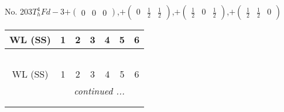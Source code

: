 \documentclass[fleqn,9pt,landscape]{jsarticle}
\begin{document}
\begin{center}
\begin{longtable}{ccccccc}
\end{longtable}
\end{center}
\newpage
No. 203\quad$T_{h}^{4}$\quad$Fd-3$\quad[ cubic ]\quad$+\begin{pmatrix} 0 & 0 & 0 \end{pmatrix}$,\quad $+\begin{pmatrix} 0 & \frac{1}{2} & \frac{1}{2} \end{pmatrix}$,\quad $+\begin{pmatrix} \frac{1}{2} & 0 & \frac{1}{2} \end{pmatrix}$,\quad $+\begin{pmatrix} \frac{1}{2} & \frac{1}{2} & 0 \end{pmatrix}$
\begin{center}
\renewcommand{\arraystretch}{1.2}
\begin{longtable}{ccccccc}
 \hline \hline
WL (SS) & 1 & 2 & 3 & 4 & 5 & 6 \\ \hline \endfirsthead

\multicolumn{6}{l}{\tablename\ \thetable{}} \\
 \hline \hline
WL (SS) & 1 & 2 & 3 & 4 & 5 & 6 \\ \hline \endhead

 \hline \hline
\multicolumn{6}{r}{\footnotesize\it continued ...} \\ \endfoot

 \hline \hline
\multicolumn{6}{r}{} \\ \endlastfoot


\end{longtable}
\end{center}
\end{document}
